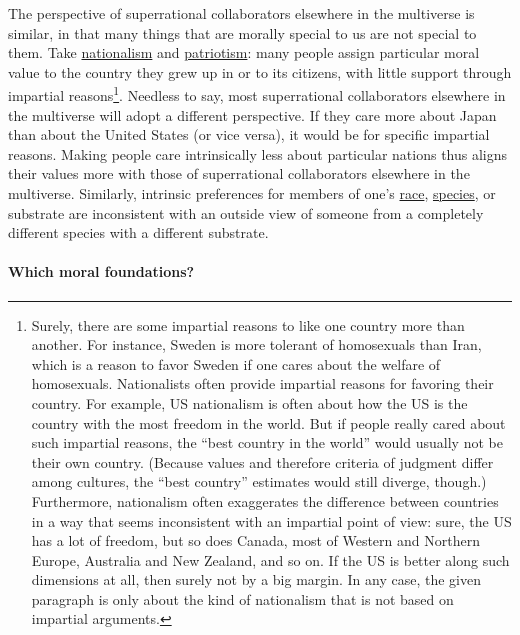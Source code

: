 The perspective of superrational collaborators elsewhere in the
multiverse is similar, in that many things that are morally special to
us are not special to them. Take
\href{https://en.wikipedia.org/wiki/Nationalism}{nationalism} and
\href{https://en.wikipedia.org/wiki/Patriotism}{patriotism}: many
people assign particular moral value to the country they grew up in or
to its citizens, with little support through impartial reasons\footnote{Surely,
  there are some impartial reasons to like one country more than
  another. For instance, Sweden is more tolerant of homosexuals than
  Iran, which is a reason to favor Sweden if one cares about the welfare
  of homosexuals. Nationalists often provide impartial reasons for
  favoring their country. For example, US nationalism is often about how
  the US is the country with the most freedom in the world. But if
  people really cared about such impartial reasons, the ``best country
  in the world'' would usually not be their own country. (Because values
  and therefore criteria of judgment differ among cultures, the ``best
  country'' estimates would still diverge, though.) Furthermore,
  nationalism often exaggerates the difference between countries in a
  way that seems inconsistent with an impartial point of view: sure, the
  US has a lot of freedom, but so does Canada, most of Western and
  Northern Europe, Australia and New Zealand, and so on. If the US is
  better along such dimensions at all, then surely not by a big margin.
  In any case, the given paragraph is only about the kind of nationalism
  that is not based on impartial arguments.}. Needless to say, most
superrational collaborators elsewhere in the multiverse will adopt a
different perspective. If they care more about Japan than about the
United States (or vice versa), it would be for specific impartial
reasons. Making people care intrinsically less about particular nations
thus aligns their values more with those of superrational collaborators
elsewhere in the multiverse. Similarly, intrinsic preferences for
members of one's
\href{https://en.wikipedia.org/wiki/Racism}{race},
\href{https://en.wikipedia.org/wiki/Speciesism}{species}, or
substrate are inconsistent with an outside view of someone from a
completely different species with a different substrate.

\paragraph{Which moral foundations?}\label{which-moral-foundations}

